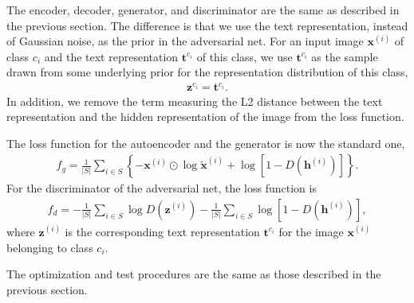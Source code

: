\documentclass{article}
\newcommand{\bb}[1]{\boldsymbol{#1}}
\begin{document}
	The encoder, decoder, generator, and discriminator are the same as described in the previous section. The difference is that we use the text representation, instead of Gaussian noise, as the prior in the adversarial net. For an input image $\bb{x}^{(i)}$ of class $c_i$ and the text representation $\bb{t}^{c_i}$ of this class, we use $\bb{t}^{c_i}$ as the sample drawn from some underlying prior for the representation distribution of this class,
	\begin{align}
		\bb{z}^{c_i} = \bb{t}^{c_i}.
	\end{align}
	In addition, we remove the term measuring the L2 distance between the text representation and the hidden representation of the image from the loss function.

	The loss function for the autoencoder and the generator is now the standard one,
	\begin{align}
		f_g = \frac{1}{|S|} \sum_{i \in S} \left\{ -\bb{x}^{(i)} \odot \log \tilde{\bb{x}}^{(i)} + \log\left[ 1 - D( \bb{h}^{(i)} ) \right] \right\}.
	\end{align}
	For the discriminator of the adversarial net, the loss function is
	\begin{align}
		f_d = -\frac{1}{|S|} \sum_{i \in S} \log D( \bb{z}^{(i)} ) - \frac{1}{|S|} \sum_{i \in S} \log\left[ 1 - D( \bb{h}^{(i)} ) \right],
	\end{align}
	where $\bb{z}^{(i)}$ is the corresponding text representation $\bb{t}^{c_i}$ for the image $\bb{x}^{(i)}$ belonging to class $c_i$.
	
	The optimization and test procedures are the same as those described in the previous section.




%
%
\end{document}
